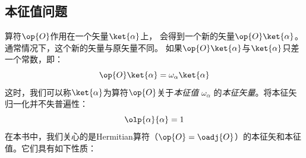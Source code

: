 

\subsection{本征值问题}
\label{sec:1.1.6}
算符$\op{O}$作用在一个矢量$\ket{\alpha}$上，
会得到一个新的矢量$\op{O}\ket{\alpha}$。
通常情况下，这个新的矢量与原矢量不同。
如果$\op{O}\ket{\alpha}$与$\ket{\alpha}$只差一个常数，即：
\begin{equation}
 \op{O}\ket{\alpha} = \omega_{\alpha}\ket{\alpha}
 \label{eq:1.72}
\end{equation}
这时，我们可以称$\ket{\alpha}$为算符$\op{O}$关于\emph{本征值} $\omega_{\alpha}$ 的\emph{本征矢量}。将本征矢归一化并不失普遍性：
\begin{equation}
 \olp{\alpha}{\alpha} = 1
 \label{eq:1.73}
\end{equation}
在本书中，我们关心的是Hermitian算符（$\op{O}=\oadj{O}$）的本征矢和本征值。它们具有如下性质：
